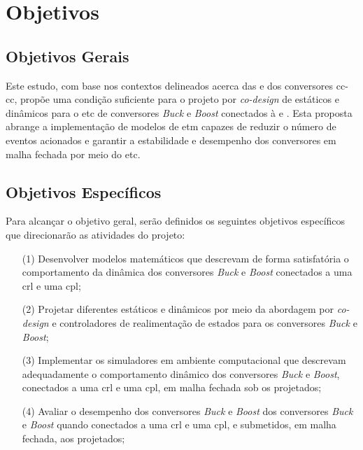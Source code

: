 \section{Objetivos}

\subsection{Objetivos Gerais}

Este estudo, com base nos contextos delineados acerca das  e dos conversores \acrshort{cc}-\acrshort{cc}, propõe uma condição suficiente para o projeto por \textit{co-design} de  estáticos e dinâmicos para o \acrshort{etc} de conversores \textit{Buck} e \textit{Boost} conectados à  e . Esta proposta abrange a implementação de modelos de \acrshort{etm} capazes de reduzir o número de eventos acionados e garantir a estabilidade e desempenho dos conversores em malha fechada por meio do \acrshort{etc}.

\subsection{Objetivos Específicos}
Para alcançar o objetivo geral, serão definidos os seguintes objetivos específicos que direcionarão as atividades do projeto:

\begin{enumerate}
  \item[(1)] Desenvolver modelos matemáticos que descrevam de forma satisfatória o comportamento da dinâmica dos conversores \textit{Buck} e \textit{Boost} conectados a uma \acrshort{crl} e uma \acrshort{cpl};
  \item[(2)] Projetar diferentes  estáticos e dinâmicos por meio da abordagem por \textit{co-design} e controladores de realimentação de estados para os conversores \textit{Buck} e \textit{Boost};
  \item[(3)] Implementar os simuladores em ambiente computacional que descrevam adequadamente o comportamento dinâmico dos conversores \textit{Buck} e \textit{Boost}, conectados a uma \acrshort{crl} e uma \acrshort{cpl}, em malha fechada sob os  projetados;
  \item[(4)] Avaliar o desempenho dos conversores \textit{Buck} e \textit{Boost} dos conversores \textit{Buck} e \textit{Boost} quando conectados a uma \acrshort{crl} e uma \acrshort{cpl}, e submetidos, em malha fechada, aos  projetados;
\end{enumerate}

